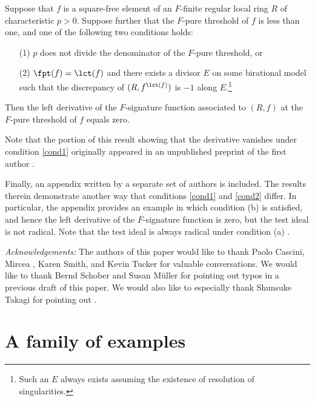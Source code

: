 \documentclass[11pt]{amsart}
\begin{document}
\begin{samepage}
\begin{theoremB*}[\autoref{thm.LeftDerivativeOfFSig},\autoref{thm.FsigDerivativeNonzeroIfFPT=LCT}]
 Suppose that $f$ is a square-free element of an $F$-finite regular local ring $R$ of characteristic $p>0$.
Suppose further that the $F$-pure threshold of $f$ is less than one, and one of the following two conditions holds:
\begin{itemize}
\item[(1)]  $p$ does not divide the denominator of the $F$-pure threshold, or
\item[(2)]  $\fpt(f) = \lct(f)$ and there exists a divisor $E$ on some birational model such that the discrepancy of $(R, f^{\lct(f)})$ is $-1$ along $E$.\footnote{Such an $E$ always exists assuming the existence of resolution of singularities.  }
\end{itemize}
Then the left derivative of the $F$-signature function associated to $(R,f)$ at the $F$-pure threshold of $f$ equals zero.
\end{theoremB*}
\end{samepage}

\noindent Note that the portion of this result showing that the derivative vanishes under condition \eqref{cond1} originally appeared in an unpublished preprint of the first author \cite{CantonLeftDerivativeOfFSignature}.

Finally, an appendix written by a separate set of authors is included.
The results therein demonstrate another way that conditions \eqref{cond1} and \eqref{cond2} differ.
In particular, the appendix provides an example in which 
condition (b) is satisfied, and hence the left derivative of the $F$-signature function is zero, but the test ideal is not radical.  Note that the test ideal is always radical under condition (a) \cite{FedderWatanabe,VassilevTestIdeals,SchwedeSharpTestElements}.

\vskip 6pt

\noindent\emph{Acknowledgements:}  The authors of this paper would like to thank Paolo Cascini, Mircea \mustata, Karen Smith, and Kevin Tucker for valuable conversations.  We would like to thank Bernd Schober and Susan M\"uller for pointing out typos in a previous draft of this paper.   We would also like to especially thank Shunsuke Takagi for pointing out \cite[Example 4.5]{MustataTakagiWatanabeFThresholdsAndBernsteinSato}.

\section{A family of examples}
\end{document}
